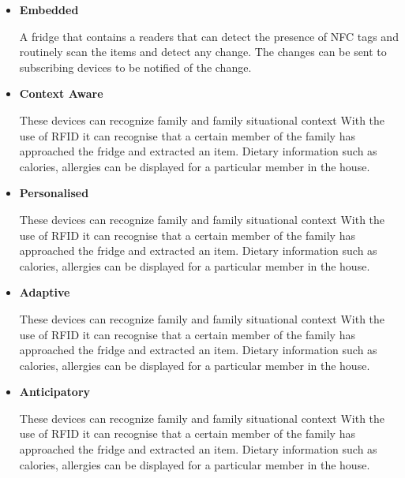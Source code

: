 \documentclass[a4paper, 11pt]{article}
\begin{document}
\begin{itemize}
  \item[] \textbf{Embedded}
  \begin{flushleft}  A fridge that contains a readers that can detect the presence of NFC tags and routinely scan the items and detect any change. The changes can be sent to subscribing devices to be notified of the change.
  \end{flushleft}
  \item[] \textbf{Context Aware} 
    \begin{flushleft} These devices can recognize family and family situational context
With the use of RFID it can recognise that a certain member of the family has approached the fridge and extracted an item. Dietary information such as calories, allergies can be displayed for a particular member in the house. 
\end{flushleft}
  \item[] \textbf{Personalised} 
    \begin{flushleft} These devices can recognize family and family situational context
With the use of RFID it can recognise that a certain member of the family has approached the fridge and extracted an item. Dietary information such as calories, allergies can be displayed for a particular member in the house. 
\end{flushleft}
  \item[] \textbf{Adaptive} 
    \begin{flushleft} These devices can recognize family and family situational context
With the use of RFID it can recognise that a certain member of the family has approached the fridge and extracted an item. Dietary information such as calories, allergies can be displayed for a particular member in the house. 
\end{flushleft}
  \item[] \textbf{Anticipatory} 
    \begin{flushleft} These devices can recognize family and family situational context
With the use of RFID it can recognise that a certain member of the family has approached the fridge and extracted an item. Dietary information such as calories, allergies can be displayed for a particular member in the house. 
\end{flushleft}
\end{itemize}
\end{document}
